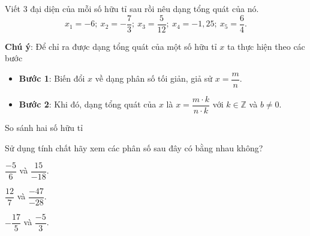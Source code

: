 \begin{vd}%
Viết $3$ đại diện của mỗi số hữu tỉ sau rồi nêu dạng tổng quát của nó. $$x_1=-6;\ x_2=-\dfrac{7}{3};\ x_3=\dfrac{5}{12};\ x_4=-1{,}25;\ x_5=\dfrac{6}{4}.$$
\end{vd}
\begin{note}{\textbf{Chú ý}}: Để chỉ ra được dạng tổng quát của một số hữu tỉ $x$ ta thực hiện theo các bước
	\begin{itemize}
		\item \textbf{Bước 1}: Biến đổi $x$ về dạng phân số tối giản, giả sử $x=\dfrac{m}{n}$.
		\item \textbf{Bước 2}: Khi đó, dạng tổng quát của $x$ là $x=\dfrac{m\cdot k}{n\cdot k}$ với $k\in\mathbb{Z}$ và $b\neq 0$.
	\end{itemize}
\end{note}

\begin{dang}{So sánh hai số hữu tỉ}
\end{dang}

\begin{vd}%
Sử dụng tính chất hãy xem các phân số sau đây có bằng nhau không?
\begin{enumEX}{3}
	\item $\dfrac{-5}{6}$ và $\dfrac{15}{-18}$.
	\item $\dfrac{12}{7}$ và $\dfrac{-47}{-28}$.
	\item $-\dfrac{17}{5}$ và $\dfrac{-5}{3}$.
\end{enumEX}
\end{vd}

